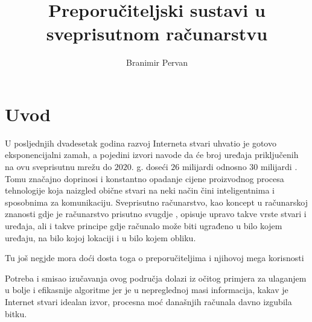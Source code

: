 \documentclass[times, utf8, diplomski, numeric]{fer}
\begin{document}
\title{Preporučiteljski sustavi u sveprisutnom računarstvu}
\author{Branimir Pervan}
\maketitle

\izvornik


\tableofcontents


\chapter{Uvod}
U posljednjih dvadesetak godina razvoj Interneta stvari  uhvatio je gotovo eksponencijalni zamah, a pojedini izvori navode da
će broj uređaja priključenih na ovu sveprisutnu mrežu do $2020$. g. doseći $26$
milijardi \cite{gartner2013Iot} odnosno $30$ milijardi \cite{ABI2013Iot}. Tomu
značajno doprinosi i konstantno opadanje cijene proizvodnog procesa tehnologije
koja naizgled obične stvari na neki način čini inteligentnima i sposobnima za
komunikaciju. Sveprisutno računarstvo, kao koncept u računarskoj znanosti
gdje je računarstvo prisutno svugdje \cite{theComputerWeiser}, opisuje upravo 
takve vrste stvari i uređaja, ali i takve principe gdje računalo može biti
ugrađeno u bilo kojem uređaju, na bilo kojoj lokaciji i u bilo kojem obliku.

Tu još negjde mora doći dosta toga o preporučiteljima i njihovoj mega
korisnosti 

Potreba i smisao izučavanja ovog područja dolazi iz očitog primjera za
ulaganjem u bolje i efikasnije algoritme jer je u nepreglednoj masi
informacija, kakav je Internet stvari idealan izvor, procesna moć današnjih
računala davno izgubila bitku.
\end{document}
